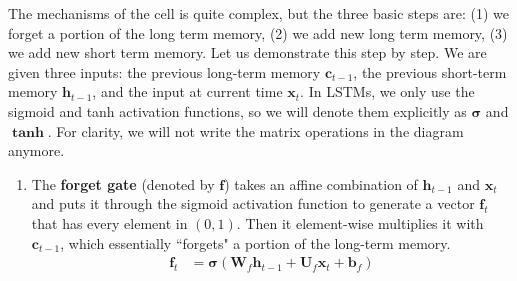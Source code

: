 \documentclass{article}
\begin{document}
  The mechanisms of the cell is quite complex, but the three basic steps are: (1) we forget a portion of the long term memory, (2) we add new long term memory, (3) we add new short term memory. Let us demonstrate this step by step. We are given three inputs: the previous long-term memory $\mathbf{c}_{t-1}$, the previous short-term memory $\mathbf{h}_{t-1}$, and the input at current time $\mathbf{x}_t$. In LSTMs, we only use the sigmoid and tanh activation functions, so we will denote them explicitly as $\boldsymbol{\sigma}$ and $\mathbf{\tanh}$. For clarity, we will not write the matrix operations in the diagram anymore. 
  \begin{enumerate}
      \item The \textbf{forget gate} (denoted by $\mathbf{f}$) takes an affine combination of $\mathbf{h}_{t-1}$ and $\mathbf{x}_t$ and puts it through the sigmoid activation function to generate a vector $\mathbf{f}_t$ that has every element in $(0, 1)$. Then it element-wise multiplies it with $\mathbf{c}_{t-1}$, which essentially ``forgets" a portion of the long-term memory. 
      \begin{align}
          \mathbf{f}_t & = \boldsymbol{\sigma}( \mathbf{W}_f \mathbf{h}_{t-1} + \mathbf{U}_f \mathbf{x}_t + \mathbf{b}_f )
      \end{align}


\end{enumerate}
\end{document}
